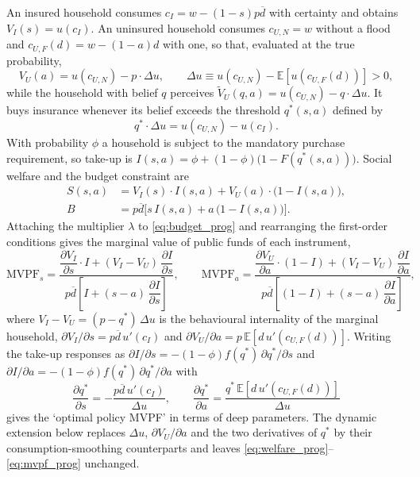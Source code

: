\documentclass[12pt]{article}
\begin{document}
An insured household consumes $c_I = w-(1-s)p\overline{d}$ with certainty and obtains $V_I(s)=u(c_I)$. An uninsured household consumes $c_{U,N}=w$ without a flood and $c_{U,F}(d)=w-(1-a)d$ with one, so that, evaluated at the true probability,
\begin{equation}
    V_U(a) = u(c_{U,N}) - p\cdot\Delta u, \qquad \Delta u \equiv u(c_{U,N})-\mathbb{E}[u(c_{U,F}(d))]>0,
\end{equation}
while the household with belief $q$ perceives $\tilde{V}_U(q,a) = u(c_{U,N}) - q\cdot\Delta u$. It buys insurance whenever its belief exceeds the threshold $q^*(s,a)$ defined by
\begin{equation}
    q^*\cdot\Delta u = u(c_{U,N}) - u(c_I). \label{eq:qstar_prog}
\end{equation}
With probability $\phi$ a household is subject to the mandatory purchase requirement, so take-up is $I(s,a) = \phi+(1-\phi)\bigl(1-F(q^*(s,a))\bigr)$. Social welfare and the budget constraint are
\begin{align}
    S(s,a) &= V_I(s)\cdot I(s,a) + V_U(a)\cdot\bigl(1-I(s,a)\bigr), \label{eq:welfare_prog}\\
    B &= p\overline{d}\bigl[s\,I(s,a) + a\,\bigl(1-I(s,a)\bigr)\bigr]. \label{eq:budget_prog}
\end{align}
Attaching the multiplier $\lambda$ to \eqref{eq:budget_prog} and rearranging the first-order conditions gives the marginal value of public funds of each instrument,
\begin{equation}
    \text{MVPF}_s = \frac{
        \dfrac{\partial V_I}{\partial s}\cdot I
         +  (V_I-V_U)\,\dfrac{\partial I}{\partial s}
    }{
        p\overline{d}\!\left[I + (s-a)\,\dfrac{\partial I}{\partial s}\right]
    }, \qquad
    \text{MVPF}_a = \frac{
        \dfrac{\partial V_U}{\partial a}\cdot(1-I)
         + (V_I-V_U)\,\dfrac{\partial I}{\partial a}
    }{
        p\overline{d}\!\left[(1-I) + (s-a)\,\dfrac{\partial I}{\partial a}\right]
    }, \label{eq:mvpf_prog}
\end{equation}
where $V_I - V_U = (p-q^*)\,\Delta u$ is the behavioural internality of the marginal household, $\partial V_I/\partial s = p\overline{d}\,u'(c_I)$ and $\partial V_U/\partial a = p\,\mathbb{E}[d\,u'(c_{U,F}(d))]$. Writing the take-up responses as $\partial I/\partial s = -(1-\phi)f(q^*)\,\partial q^*/\partial s$ and $\partial I/\partial a = -(1-\phi)f(q^*)\,\partial q^*/\partial a$ with
\begin{equation}
    \frac{\partial q^*}{\partial s} = -\frac{p\overline{d}\,u'(c_I)}{\Delta u}, \qquad
    \frac{\partial q^*}{\partial a} = \frac{q^*\,\mathbb{E}[d\,u'(c_{U,F}(d))]}{\Delta u}
\end{equation}
gives the `optimal policy MVPF' in terms of deep parameters. The dynamic extension below replaces $\Delta u$, $\partial V_U/\partial a$ and the two derivatives of $q^*$ by their consumption-smoothing counterparts and leaves \eqref{eq:welfare_prog}--\eqref{eq:mvpf_prog} unchanged.
\end{document}
